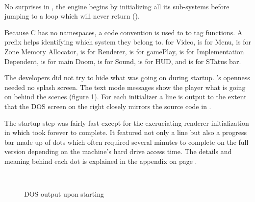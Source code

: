 \\
\par
{}
\par
No surprises in , the engine begins by initializing all its sub-systems before jumping to a loop which will never return ().\\
\par
Because C has no namespaces, a code convention is used to to tag functions. A prefix helps identifying which system they belong to.  for Video,  is for Menu,  is for Zone Memory Allocator,  is for Renderer,  is for gamePlay,  is for Implementation Dependent,  is for main Doom,  is for Sound,  is for HUD, and  is for STatus bar.\\
\par
The developers did not try to hide what was going on during startup. \doom's openness needed no splash screen. The text mode messages show the player what is going on behind the scenes (figure \ref{dosloading}). For each initializer a line is output to the extent that the DOS screen on the right closely mirrors the source code in .\\
\par
The startup step was fairly fast except for the excruciating renderer initialization in  which took forever to complete. It featured not only a line but also a progress bar made up of dots which often required several minutes to complete on the full version depending on the machine's hard drive access time. The details and meaning behind each dot is explained in the appendix on page \pageref{dots_explained}.\\
\par
{}\\
\begin{figure}[H]
\caption{DOS output upon starting }
\label{dosloading}
\end{figure}

